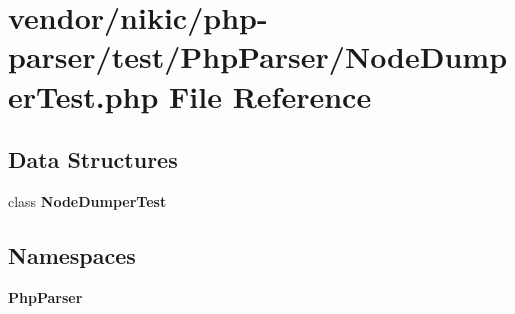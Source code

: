 \section{vendor/nikic/php-\/parser/test/\+Php\+Parser/\+Node\+Dumper\+Test.php File Reference}
\label{_node_dumper_test_8php}
\subsection*{Data Structures}
\begin{DoxyCompactItemize}
\item 
class {\bf Node\+Dumper\+Test}
\end{DoxyCompactItemize}
\subsection*{Namespaces}
\begin{DoxyCompactItemize}
\item 
 {\bf Php\+Parser}
\end{DoxyCompactItemize}
